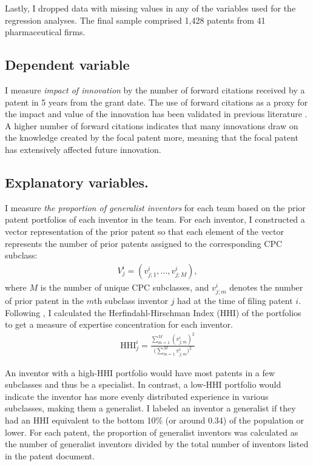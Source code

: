 \documentclass{article}
\begin{document}
Lastly, I dropped data with missing values in any of the variables used for the regression analyses. The final sample comprised 1,428 patents from 41 pharmaceutical firms.

\subsection{Dependent variable}
I measure \textit{impact of innovation} by the number of forward citations received by a patent in 5 years from the grant date. The use of forward citations as a proxy for the impact and value of the innovation has been validated in previous literature \autocite{Hall2001,Hall2005,Ahuja2001}. A higher number of forward citations indicates that many innovations draw on the knowledge created by the focal patent more, meaning that the focal patent has extensively affected future innovation.

\subsection{Explanatory variables.} \label{expvar}
I measure \textit{the proportion of generalist inventors} for each team based on the prior patent portfolios of each inventor in the team. For each inventor, I constructed a vector representation of the prior patent so that each element of the vector represents the number of prior patents assigned to the corresponding CPC subclass:
\begin{align*}
    V_j^i = (v_{j;1}^i,\dots,v_{j;M}^i),
\end{align*}
where $M$ is the number of unique CPC subclasses, and $v_{j;m}^i$ denotes the number of prior patent in the $m$th subclass inventor $j$ had at the time of filing patent $i$.
Following \textcite{Melero2015}, I calculated the Herfindahl-Hirschman Index (HHI) of the portfolios to get a measure of expertise concentration for each inventor.
\begin{align*}
    \text{HHI}_j^i = \frac{\sum_{m=1}^{M}{(v_{j;m}^i)^2}}{(\sum_{m=1}^{M}{v_{j;m}^i)^2}}
\end{align*}

An inventor with a high-HHI portfolio would have most patents in a few subclasses and thus be a specialist. In contrast, a low-HHI portfolio would indicate the inventor has more evenly distributed experience in various subclasses, making them a generalist. I labeled an inventor a generalist if they had an HHI equivalent to the bottom 10\% (or around 0.34) of the population or lower.
For each patent, the proportion of generalist inventors was calculated as the number of generalist inventors divided by the total number of inventors listed in the patent document.
\end{document}
